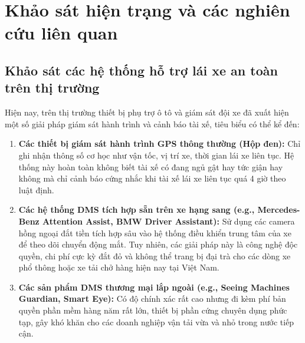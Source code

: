 \documentclass[../DoAn.tex]{subfiles}
\begin{document}
\section{Khảo sát hiện trạng và các nghiên cứu liên quan}
\label{section:2.1}

\subsection{Khảo sát các hệ thống hỗ trợ lái xe an toàn trên thị trường}
Hiện nay, trên thị trường thiết bị phụ trợ ô tô và giám sát đội xe đã xuất hiện một số giải pháp giám sát hành trình và cảnh báo tài xế, tiêu biểu có thể kể đến:
\begin{enumerate}
    \item \textbf{Các thiết bị giám sát hành trình GPS thông thường (Hộp đen):} Chỉ ghi nhận thông số cơ học như vận tốc, vị trí xe, thời gian lái xe liên tục. Hệ thống này hoàn toàn không biết tài xế có đang ngủ gật hay tức giận hay không mà chỉ cảnh báo cứng nhắc khi tài xế lái xe liên tục quá 4 giờ theo luật định.
    \item \textbf{Các hệ thống DMS tích hợp sẵn trên xe hạng sang (e.g., Mercedes-Benz Attention Assist, BMW Driver Assistant):} Sử dụng các camera hồng ngoại đắt tiền tích hợp sâu vào hệ thống điều khiển trung tâm của xe để theo dõi chuyển động mắt. Tuy nhiên, các giải pháp này là công nghệ độc quyền, chi phí cực kỳ đắt đỏ và không thể trang bị đại trà cho các dòng xe phổ thông hoặc xe tải chở hàng hiện nay tại Việt Nam.
    \item \textbf{Các sản phẩm DMS thương mại lắp ngoài (e.g., Seeing Machines Guardian, Smart Eye):} Có độ chính xác rất cao nhưng đi kèm phí bản quyền phần mềm hàng năm rất lớn, thiết bị phần cứng chuyên dụng phức tạp, gây khó khăn cho các doanh nghiệp vận tải vừa và nhỏ trong nước tiếp cận.
\end{enumerate}
\end{document}
